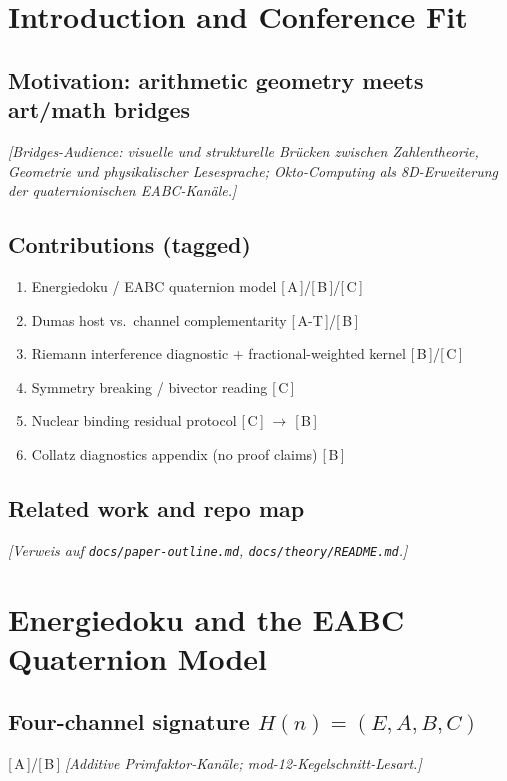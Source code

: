 \documentclass[11pt,a4paper]{article}
\newcommand{\evidence}[1]{\textnormal{[\,#1\,]}}
\newcommand{\placeholder}[1]{\textit{[#1]}}
\newcommand{\repo}[1]{\texttt{#1}}
\begin{document}
\section{Introduction and Conference Fit}
\label{sec:intro}

\subsection{Motivation: arithmetic geometry meets art/math bridges}
\placeholder{Bridges-Audience: visuelle und strukturelle Brücken zwischen Zahlentheorie,
Geometrie und physikalischer Lesesprache; Okto-Computing als 8D-Erweiterung der
quaternionischen EABC-Kanäle.}

\subsection{Contributions (tagged)}
\begin{enumerate}
  \item Energiedoku / EABC quaternion model \evidence{A}/\evidence{B}/\evidence{C}
  \item Dumas host vs.\ channel complementarity \evidence{A-T}/\evidence{B}
  \item Riemann interference diagnostic + fractional-weighted kernel \evidence{B}/\evidence{C}
  \item Symmetry breaking / bivector reading \evidence{C}
  \item Nuclear binding residual protocol \evidence{C} $\to$ \evidence{B}
  \item Collatz diagnostics appendix (no proof claims) \evidence{B}
\end{enumerate}

\subsection{Related work and repo map}
\placeholder{Verweis auf \repo{docs/paper-outline.md}, \repo{docs/theory/README.md}.}

\section{Energiedoku and the EABC Quaternion Model}
\label{sec:eabc}

\subsection{Four-channel signature $H(n)=(E,A,B,C)$}
\evidence{A}/\evidence{B}
\placeholder{Additive Primfaktor-Kanäle; mod-12-Kegelschnitt-Lesart.}
\end{document}
